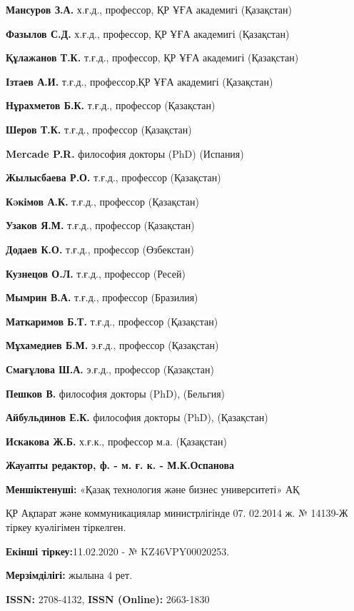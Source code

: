 \textbf{Мансуров З.А.} х.ғ.д., профессор, ҚР ҰҒА академигі (Қазақстан)

\textbf{Фазылов С.Д.} х.ғ.д., профессор, ҚР ҰҒА академигі (Қазақстан)

\textbf{Құлажанов Т.К.} т.ғ.д., профессор, ҚР ҰҒА академигі (Қазақстан)

\textbf{Ізтаев А.И.} т.ғ.д., профессор,ҚР ҰҒА академигі (Қазақстан)

\textbf{Нұрахметов Б.К.} т.ғ.д., профессор (Қазақстан)

\textbf{Шеров Т.К.} т.ғ.д., профессор (Қазақстан)

\textbf{Mercade P.R.} философия докторы (PhD) (Испания)

\textbf{Жылысбаева Р.О.} т.ғ.д., профессор (Қазақстан)

\textbf{Кəкімов А.К.} т.ғ.д., профессор (Қазақстан)

\textbf{Узаков Я.М.} т.ғ.д., профессор (Қазақстан)

\textbf{Додаев К.О.} т.ғ.д., профессор (Өзбекстан)

\textbf{Кузнецов О.Л.} т.ғ.д., профессор (Ресей)

\textbf{Мымрин В.А.} т.ғ.д., профессор (Бразилия)

\textbf{Маткаримов Б.Т.} т.ғ.д., профессор (Қазақстан)

\textbf{Мұхамедиев Б.М.} э.ғ.д., профессор (Қазақстан)

\textbf{Смағұлова Ш.А.} э.ғ.д., профессор (Қазақстан)

\textbf{Пешков В.} философия докторы (PhD), (Бельгия)

\textbf{Айбульдинов Е.К.} философия докторы (PhD), (Қазақстан)

\textbf{Искакова Ж.Б.} х.ғ.к., профессор м.а. (Қазақстан)

\begin{center}
\textbf{Жауапты редактор, ф. - м. ғ. к. - М.К.Оспанова}
\end{center}

\textbf{Меншіктенуші:} «Қазақ технология және бизнес университеті» АҚ

ҚР Ақпарат және коммуникациялар министрлігінде 07. 02.2014 ж. № 14139-Ж
тіркеу куәлігімен тіркелген.

\textbf{Екінші тіркеу:}11.02.2020 - № KZ46VPY00020253.

\textbf{Мерзімділігі:} жылына 4 рет.

\textbf{ISSN:} 2708-4132, \textbf{ISSN (Online):} 2663-1830

